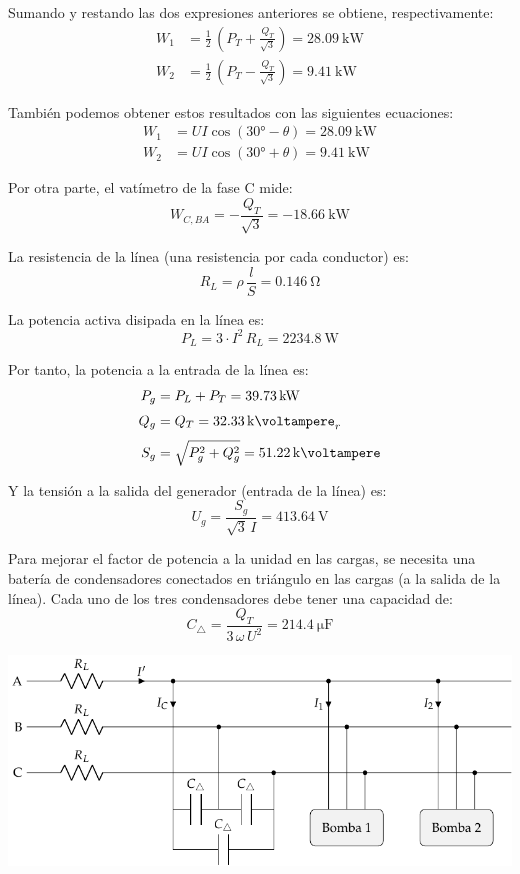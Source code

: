 Sumando y restando las dos expresiones anteriores se obtiene, respectivamente:
\begin{align*}
  W_1 &= \frac{1}{2} \, \left(P_T + \frac{Q_T}{\sqrt{3}} \right) = \SI{28.09}{\kilo\watt}\\[3pt]
  W_2 &= \frac{1}{2} \, \left(P_T - \frac{Q_T}{\sqrt{3}} \right) = \SI{9.41}{\kilo\watt}
\end{align*}

También podemos obtener estos resultados con las siguientes ecuaciones:
\begin{align*}
  W_1 &= U I \cos(\ang{30} - \theta) = \SI{28.09}{\kilo\watt}\\[3pt]
  W_2 &= U I \cos(\ang{30} + \theta) = \SI{9.41}{\kilo\watt}
\end{align*}

Por otra parte, el vatímetro de la fase C mide:
\[
  W_{C, BA} = - \frac{Q_T}{\sqrt{3}} = - \SI{18.66}{\kilo\watt}
\]

La resistencia de la línea (una resistencia por cada conductor) es:
\[
R_L = \rho \, \frac{l}{S} = \SI{0.146}{\ohm}
\]

La potencia activa disipada en la línea es:
\[
P_L = 3 \cdot I^2 \, R_L = \SI{2234.8}{\watt}
\]

Por tanto, la potencia a la entrada de la línea es:
\begin{align*}
    P_g &= P_L + P_T = \SI{39.73}{\kilo\watt}\\[3pt]
    Q_g &= Q_T = \SI{32.33}{\kilo\voltampere}_r\\[3pt]
    S_g &= \sqrt{P_g^2 + Q_g^2} = \SI{51.22}{\kilo\voltampere}
\end{align*}

\vspace{2mm}
Y la tensión a la salida del generador (entrada de la línea) es:
\[
U_g = \frac{S_g}{\sqrt{3} \, I} = \SI{413.64}{\volt}
\]

Para mejorar el factor de potencia a la unidad en las cargas, se necesita una batería de condensadores conectados en triángulo en las cargas (a la salida de la línea). Cada uno de los tres condensadores debe tener una capacidad de:
\[
C_{\triangle} = \frac{Q_T}{3 \, \omega \, U^2} = \SI{214.4}{\micro\farad}
\]

\begin{center}
    \includegraphics[width=.85\textwidth]{figuras/BT3_ej5_bombas_condensadores.pdf}
\end{center}

